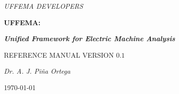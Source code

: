\documentclass[justified]{tufte-book} %
\newcommand{\uffemaVersion}{0.1}
\newcommand{\openepigraph}[2]{ %
\begin{fullwidth}
\sffamily\large
\begin{doublespace}
\noindent\allcaps{#1}\\ %
\noindent\allcaps{#2} %
\end{doublespace}
\end{fullwidth}
}
\begin{document}
 \frontmatter

\begin{titlepage}
\begin{fullwidth}

	\centering
	{\LARGE \textit{UFFEMA DEVELOPERS} \par}
	\vspace{5cm}
	{\fontsize{40}{50}\selectfont\bfseries UFFEMA:\par}
	{\fontsize{30}{40}\selectfont\itshape\bfseries Unified Framework for Electric Machine Analysis\par}
	\vspace{2cm}
	{\LARGE\flushright  REFERENCE MANUAL VERSION $\uffemaVersion$\par}
	\vspace{7cm}
	{\Large\itshape Dr. A. J. Pi\~{n}a Ortega\par}

	\vfill

	{\large \today\par}

\end{fullwidth}
\end{titlepage}





\end{document}
